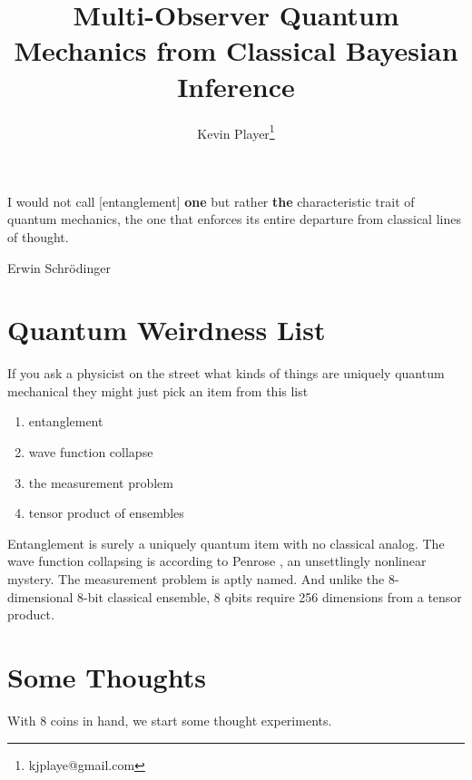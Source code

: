 \documentclass[12pt,a4paper]{article}
\begin{document}
\title{Multi-Observer Quantum Mechanics from Classical Bayesian Inference}
\author[1]{Kevin Player\footnote{kjplaye@gmail.com}}

\maketitle


\epigraph{I would not call [entanglement] {\bf one} but rather {\bf the} characteristic trait of quantum mechanics, the one that enforces its entire departure from classical lines of thought.}{Erwin Schrödinger}


\section{Quantum Weirdness List}
If you ask a physicist on the street what kinds of things are uniquely quantum mechanical they might just pick an item from this list

\begin{enumerate}
\item entanglement
\item wave function collapse
\item the measurement problem
\item tensor product of ensembles
\end{enumerate}

Entanglement is surely a uniquely quantum item with no classical analog.  The wave function collapsing is according to Penrose \cite{penrose}, an unsettlingly nonlinear mystery.  The measurement problem is aptly named.  And unlike the 8-dimensional 8-bit classical ensemble, 8 qbits require 256 dimensions from a tensor product.

\section{Some Thoughts}
With 8 coins in hand, we start some thought experiments.
\end{document}
